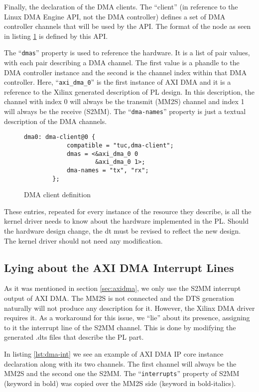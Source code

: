 Finally, the declaration of the DMA clients. 
The ``client'' (in reference to the Linux DMA Engine API, not the DMA controller) defines
a set of DMA controller channels that will be used by the API. 
The format of the node as seen in listing \ref{lst:dmaclient} is defined by this API. 

The ``\texttt{dmas}'' property is used to reference the hardware.
It is a list of pair values, with each pair describing a DMA channel.
The first value is a phandle to the DMA controller instance 
and the second is the channel index within that DMA controller.
Here, ``\texttt{axi\_dma\_0}'' is the first instance of AXI DMA and it is a reference
to the Xilinx generated description of PL design. In this description, the channel with index 0
will always be the transmit (MM2S) channel and index 1 will always be the receive (S2MM).
The ``\texttt{dma-names}'' property is just a textual description of the DMA channels.

\begin{figure}[ht!]
\centering
\begin{lstlisting}[style=basic]
		dma0: dma-client@0 {
			compatible = "tuc,dma-client";
			dmas = <&axi_dma_0 0
					&axi_dma_0 1>;
			dma-names = "tx", "rx";
		};
\end{lstlisting}
\caption{DMA client definition}
\label{lst:dmaclient}
\end{figure}

These entries, repeated for every instance of the resource they describe, is all the kernel driver
needs to know about the hardware implemented in the PL. 
Should the hardware design change, the \gls{dt} must be revised to reflect the new design.
The kernel driver should not need any modification.

\subsection{Lying about the AXI DMA Interrupt Lines}

As it was mentioned in section \ref{sec:axidma}, we only use the S2MM interrupt output of AXI DMA.
The MM2S is not connected and the DTS generation naturally will not produce any description for it.
However, the Xilinx DMA driver requires it. As a workaround for this issue, we ``lie'' about its presence,
assigning to it the interrupt line of the S2MM channel. This is done by modifying the generated .dts files
that describe the PL part.

In listing \ref{lst:dma-int} we see an example of AXI DMA IP core 
instance declaration along with its two channels.
The first channel will always be the MM2S and the second one the S2MM.
The ``\texttt{interrupts}'' property of S2MM (keyword in bold) was copied over
the MM2S side (keyword in bold-italics).

